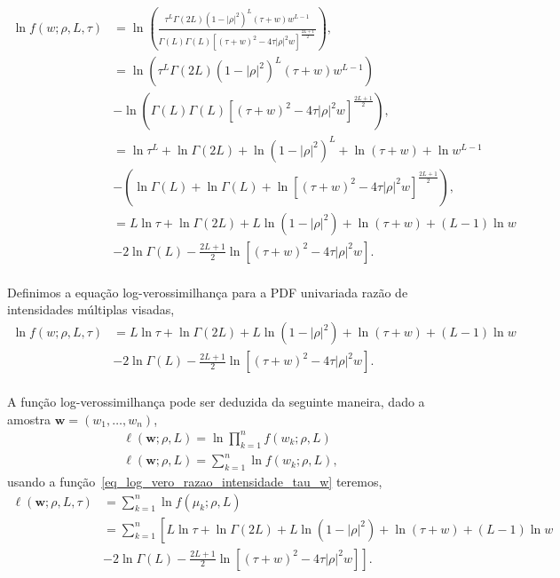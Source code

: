 \begin{equation}\nonumber
\begin{split}
	\ln f(w;\rho,L,\tau)&=\ln\left(\frac{\tau^L\Gamma(2L)(1-|\rho|^2)^{L}(\tau+w)w^{L-1}}{\Gamma(L)\Gamma(L)\left[(\tau+w)^2-4\tau|\rho|^2w \right]^{\frac{2L+1}{2}}}\right),\\
	                &=\ln\left(\tau^L\Gamma(2L)(1-|\rho|^2)^{L}(\tau+w)w^{L-1}\right)\\
	                &-\ln\left(\Gamma(L)\Gamma(L)\left[(\tau+w)^2-4\tau|\rho|^2w \right]^{\frac{2L+1}{2}}\right),\\
	                &=\ln\tau^L + \ln\Gamma(2L) +\ln(1-|\rho|^2)^{L}+\ln(\tau+w)+\ln w^{L-1}\\
	                &-\left(\ln\Gamma(L)+\ln\Gamma(L)+\ln\left[(\tau+w)^2-4\tau|\rho|^2w \right]^{\frac{2L+1}{2}}\right),\\
	                &=L\ln\tau + \ln\Gamma(2L) +L\ln(1-|\rho|^2)+\ln(\tau+w)+(L-1)\ln w\\
	                &-2\ln\Gamma(L)-\frac{2L+1}{2}\ln\left[(\tau+w)^2-4\tau|\rho|^2w \right].\\
\end{split}
\end{equation}

Definimos a equação log-verossimilhança para a PDF univariada razão de intensidades múltiplas visadas,
\begin{equation}\label{eq_log_vero_razao_intensidade_tau_w}
\begin{split}	
	\ln f(w;\rho,L,\tau)&=L\ln\tau + \ln\Gamma(2L) +L\ln(1-|\rho|^2)+\ln(\tau+w)+(L-1)\ln w\\
	                      &-2\ln\Gamma(L)-\frac{2L+1}{2}\ln\left[(\tau+w)^2-4\tau|\rho|^2w \right].\\
\end{split}
\end{equation}

A função log-verossimilhança pode ser deduzida da seguinte maneira, dado a amostra $\bm w = (w_1,\dots,w_n)$, 
\begin{equation}\nonumber
\begin{split}
  \ell(\bm w;\rho, L)=\ln\prod_{k=1}^{n}f(w_k;\rho,L)\\
  \ell(\bm w;\rho, L)=\sum_{k=1}^{n}\ln f(w_k;\rho,L),
 \end{split}
 \end{equation}
usando a função~\eqref{eq_log_vero_razao_intensidade_tau_w} teremos,
\begin{equation}\nonumber
\begin{split}
    \ell(\bm w;\rho, L, \tau)&=\sum_{k=1}^{n}\ln f(\mu_k;\rho, L)\\
                         &=\sum_{k=1}^{n}\left[L\ln\tau + \ln\Gamma(2L) +L\ln(1-|\rho|^2)+\ln(\tau+w)+(L-1)\ln w\right.\\
	                     &-\left.2\ln\Gamma(L)-\frac{2L+1}{2}\ln\left[(\tau+w)^2-4\tau|\rho|^2w \right]\right].\\
 \end{split}
 \end{equation}
 
